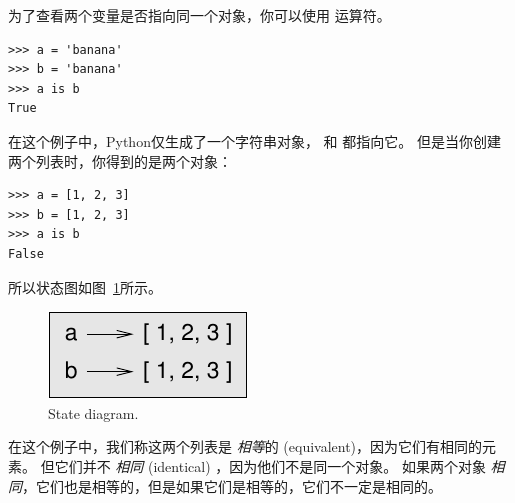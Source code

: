   


为了查看两个变量是否指向同一个对象，你可以使用  运算符。

\begin{lstlisting}
>>> a = 'banana'
>>> b = 'banana'
>>> a is b
True
\end{lstlisting}

%

在这个例子中，Python仅生成了一个字符串对象， 和  都指向它。 但是当你创建两个列表时，你得到的是两个对象：

\begin{lstlisting}
>>> a = [1, 2, 3]
>>> b = [1, 2, 3]
>>> a is b
False
\end{lstlisting}

%

所以状态图如图~\ref{fig.list2}所示。

  

\begin{figure}
\centerline
{\includegraphics[scale=0.8]{../source/figs/list2.pdf}}
\caption{State diagram.}
\label{fig.list2}
\end{figure}


在这个例子中，我们称这两个列表是 {\em 相等}的 (equivalent)，因为它们有相同的元素。 但它们并不 {\em 相同} (identical) ，因为他们不是同一个对象。 如果两个对象 {\em 相同}，它们也是相等的，但是如果它们是相等的，它们不一定是相同的。

  

